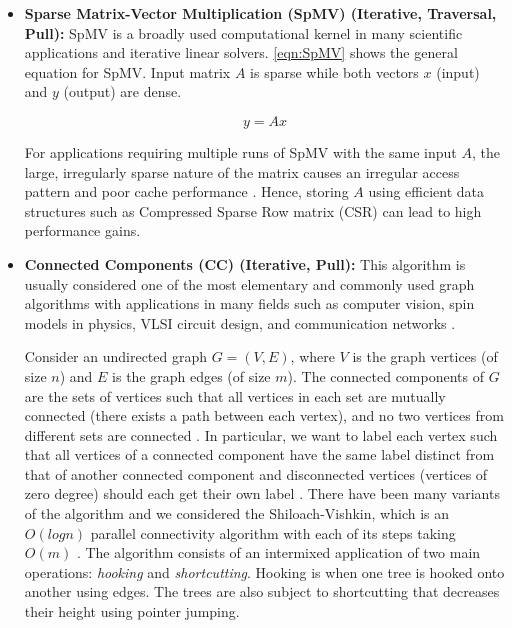 \documentclass[sigconf, nonacm]{acmart}
\begin{document}
\begin{itemize}[topsep=2pt,itemsep=2pt,wide]
The algorithm initializes the distance to source $v$ to 0 and to all other destinations to infinity. The algorithm runs for $(n-1)$ iterations, where $n$ is the number of vertices in the graph. At each iteration, the algorithm visits all graph edges. If the distance to a destination can be shortened by taking the edge, the algorithm updates it to the new lower value. At each iteration $i$, the algorithm finds all shortest paths of at most $i$ edges. Since the longest possible path can at most be $(n-1)$ edges away, the algorithm must scan the edges $(n-1)$ times to ensure the shortest path is found for all destinations.

\item \textbf{Sparse Matrix-Vector Multiplication (SpMV) (Iterative, Traversal, Pull): }
SpMV is a broadly used computational kernel in many scientific applications and iterative linear solvers. \ref{eqn:SpMV} shows the general equation for SpMV. Input matrix $A$ is sparse while both vectors $x$ (input) and $y$ (output) are dense.

\begin{equation}\label{eqn:SpMV}
	{
		y=Ax
	}
\end{equation}

For applications requiring multiple runs of SpMV with the same input $A$, the large, irregularly sparse nature of the matrix causes an irregular access pattern and poor cache performance \cite{akbudak_technical_2012}. Hence, storing $A$ using efficient data structures such as Compressed Sparse Row matrix (CSR) can lead to high performance gains.

\item \textbf{Connected Components (CC) (Iterative, Pull): }
This algorithm is usually considered one of the most elementary and commonly used graph algorithms with applications in many fields such as computer vision, spin models in physics, VLSI circuit design, and communication networks \cite{greiner_comparison_1994}.

Consider an undirected graph $G = (V,E)$, where $V$ is the graph vertices (of size $n$) and $E$ is the graph edges (of size $m$). The connected components of $G$ are the sets of vertices such that all vertices in each set are mutually connected (there exists a path between each vertex), and no two vertices from different sets are connected \cite{greiner_comparison_1994}. In particular, we want to label each vertex such that all vertices of a connected component have the same label distinct from that of another connected component and disconnected vertices (vertices of zero degree) should each get their own label \cite{beamer_gap_2017}. There have been many variants of the algorithm and we considered the Shiloach-Vishkin, which is an $O(log n)$ parallel connectivity algorithm with each of its steps taking $O(m)$ \cite{shiloach_ologn_1982}. The algorithm consists of an intermixed application of two main operations: \emph{hooking} and \emph{shortcutting}. Hooking is when one tree is hooked onto another using edges. The trees are also subject to shortcutting that decreases their height using pointer jumping. 
\end{itemize}
\end{document}
